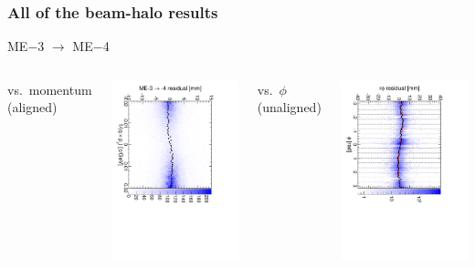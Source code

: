 \documentclass[compress]{beamer}
\begin{document}
\begin{frame}
\frametitle{All of the beam-halo results}

\begin{center}
ME$-$3 $\to$ ME$-$4
\end{center}

\begin{columns}
\centering vs.\ momentum (aligned)

\includegraphics[height=\linewidth, angle=90]{linear_mem3to4.pdf}

\centering vs.\ $\phi$ (unaligned)

\includegraphics[height=\linewidth, angle=90]{diskiter01_m3to4.pdf}


\end{columns}
\end{frame}
\end{document}
